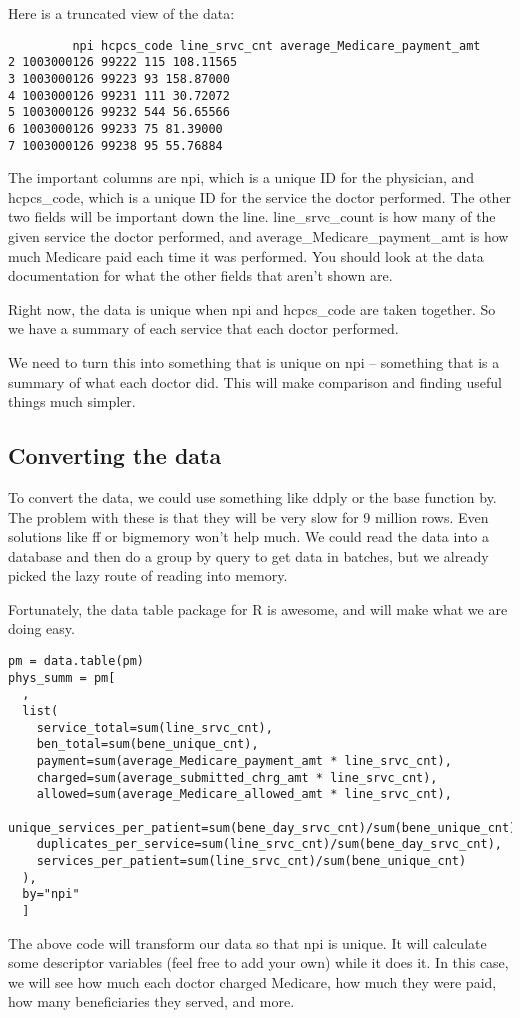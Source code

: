 Here is a truncated view of the data:
\begin{framed}
\begin{verbatim}
         npi hcpcs_code line_srvc_cnt average_Medicare_payment_amt
2 1003000126 99222 115 108.11565
3 1003000126 99223 93 158.87000
4 1003000126 99231 111 30.72072
5 1003000126 99232 544 56.65566
6 1003000126 99233 75 81.39000
7 1003000126 99238 95 55.76884
\end{verbatim}
\end{framed}
The important columns are npi, which is a unique ID for the physician, and hcpcs\_code, which is a unique ID for the service the doctor performed. The other two fields will be important down the line. line\_srvc\_count is how many of the given service the doctor performed, and average\_Medicare\_payment\_amt is how much Medicare paid each time it was performed. You should look at the data documentation for what the other fields that aren't shown are.

Right now, the data is unique when npi and hcpcs\_code are taken together. So we have a summary of each service that each doctor performed.

We need to turn this into something that is unique on npi -- something that is a summary of what each doctor did. This will make comparison and finding useful things much simpler.

\subsection*{Converting the data}
To convert the data, we could use something like ddply or the base function by. The problem with these is that they will be very slow for 9 million rows. Even solutions like ff or bigmemory won't help much. We could read the data into a database and then do a group by query to get data in batches, but we already picked the lazy route of reading into memory.

Fortunately, the data table package for R is awesome, and will make what we are doing easy.

\begin{framed}
\begin{verbatim}
pm = data.table(pm)
phys_summ = pm[
  ,
  list(
    service_total=sum(line_srvc_cnt),
    ben_total=sum(bene_unique_cnt),
    payment=sum(average_Medicare_payment_amt * line_srvc_cnt),
    charged=sum(average_submitted_chrg_amt * line_srvc_cnt),
    allowed=sum(average_Medicare_allowed_amt * line_srvc_cnt),
    unique_services_per_patient=sum(bene_day_srvc_cnt)/sum(bene_unique_cnt),
    duplicates_per_service=sum(line_srvc_cnt)/sum(bene_day_srvc_cnt),
    services_per_patient=sum(line_srvc_cnt)/sum(bene_unique_cnt)
  ),
  by="npi"
  ]

\end{verbatim}
\end{framed}
The above code will transform our data so that npi is unique. It will calculate some descriptor variables (feel free to add your own) while it does it. In this case, we will see how much each doctor charged Medicare, how much they were paid, how many beneficiaries they served, and more.

